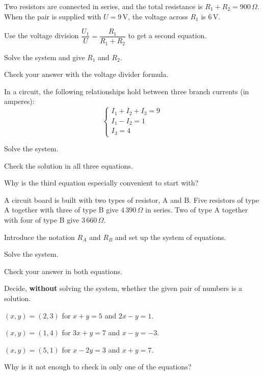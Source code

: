 Two resistors are connected in series, and the total resistance is $R_1 + R_2 = 900\,\Omega$. When
the pair is supplied with $U = 9\,\text{V}$, the voltage across $R_1$ is $6\,\text{V}$.
\begin{parts}
  \item Use the voltage division $\dfrac{U_1}{U} = \dfrac{R_1}{R_1 + R_2}$ to get a second
    equation.
  \item Solve the system and give $R_1$ and $R_2$.
  \item Check your answer with the voltage divider formula.
\end{parts}

In a circuit, the following relationships hold between three branch currents (in amperes):
\[
  \begin{cases}
    I_1 + I_2 + I_3 = 9 \\
    I_1 - I_2 = 1 \\
    I_3 = 4
  \end{cases}
\]
\begin{parts}
  \item Solve the system.
  \item Check the solution in all three equations.
  \item Why is the third equation especially convenient to start with?
\end{parts}

A circuit board is built with two types of resistor, A and B. Five resistors of type A together
with three of type B give $4\,390\,\Omega$ in series. Two of type A together with four of type B
give $3\,660\,\Omega$.
\begin{parts}
  \item Introduce the notation $R_A$ and $R_B$ and set up the system of equations.
  \item Solve the system.
  \item Check your answer in both equations.
\end{parts}

Decide, \textbf{without} solving the system, whether the given pair of numbers is a solution.
\begin{parts}
  \item $(x, y) = (2, 3)$ for $x + y = 5$ and $2x - y = 1$.
  \item $(x, y) = (1, 4)$ for $3x + y = 7$ and $x - y = -3$.
  \item $(x, y) = (5, 1)$ for $x - 2y = 3$ and $x + y = 7$.
  \item Why is it not enough to check in only one of the equations?
\end{parts}

